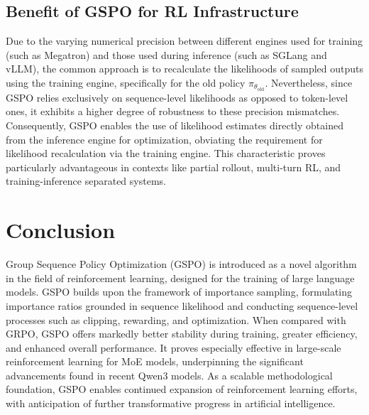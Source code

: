 \subsection{Benefit of GSPO for RL Infrastructure}

Due to the varying numerical precision between different engines used for training (such as Megatron) and those used during inference (such as SGLang and vLLM), the common approach is to recalculate the likelihoods of sampled outputs using the training engine, specifically for the old policy $\pi_{\theta_\text{old}}$. Nevertheless, since GSPO relies exclusively on sequence-level likelihoods as opposed to token-level ones, it exhibits a higher degree of robustness to these precision mismatches. Consequently, GSPO enables the use of likelihood estimates directly obtained from the inference engine for optimization, obviating the requirement for likelihood recalculation via the training engine. This characteristic proves particularly advantageous in contexts like partial rollout, multi-turn RL, and training-inference separated systems.

\section{Conclusion}

Group Sequence Policy Optimization (GSPO) is introduced as a novel algorithm in the field of reinforcement learning, designed for the training of large language models. GSPO builds upon the framework of importance sampling, formulating importance ratios grounded in sequence likelihood and conducting sequence-level processes such as clipping, rewarding, and optimization. When compared with GRPO, GSPO offers markedly better stability during training, greater efficiency, and enhanced overall performance. It proves especially effective in large-scale reinforcement learning for MoE models, underpinning the significant advancements found in recent Qwen3 models. As a scalable methodological foundation, GSPO enables continued expansion of reinforcement learning efforts, with anticipation of further transformative progress in artificial intelligence.

